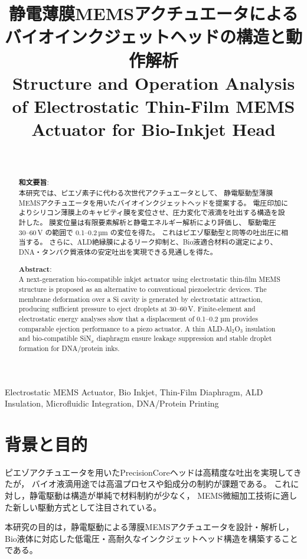 \documentclass[conference]{IEEEtran}
\title{静電薄膜MEMSアクチュエータによるバイオインクジェットヘッドの構造と動作解析\\
\large Structure and Operation Analysis of Electrostatic Thin-Film MEMS Actuator for Bio-Inkjet Head}
\author{%
  \IEEEauthorblockN{三溝 真一（Shinichi Samizo)}\\
  \IEEEauthorblockA{独立系半導体研究者（元セイコーエプソン）\\
  Email: \href{mailto:shin3t72@gmail.com}{shin3t72@gmail.com}\\
  GitHub: \url{https://github.com/Samizo-AITL}}%
}
\begin{document}
\maketitle

\begin{abstract}
\textbf{和文要旨}:\\
本研究では、ピエゾ素子に代わる次世代アクチュエータとして、
静電駆動型薄膜MEMSアクチュエータを用いたバイオインクジェットヘッドを提案する。
電圧印加によりシリコン薄膜上のキャビティ膜を変位させ、圧力変化で液滴を吐出する構造を設計した。
膜変位量は有限要素解析と静電エネルギー解析により評価し、
駆動電圧 30--60\,V の範囲で 0.1--0.2\,µm の変位を得た。
これはピエゾ駆動型と同等の吐出圧に相当する。
さらに、ALD絶縁膜によるリーク抑制と、Bio液適合材料の選定により、
DNA・タンパク質液体の安定吐出を実現できる見通しを得た。

\medskip
\noindent\textbf{Abstract}:\\
A next-generation bio-compatible inkjet actuator using electrostatic thin-film MEMS structure
is proposed as an alternative to conventional piezoelectric devices.
The membrane deformation over a Si cavity is generated by electrostatic attraction,
producing sufficient pressure to eject droplets at 30–60\,V.
Finite-element and electrostatic energy analyses show that a displacement of 0.1–0.2 µm
provides comparable ejection performance to a piezo actuator.
A thin ALD-Al$_2$O$_3$ insulation and bio-compatible SiN$_x$ diaphragm
ensure leakage suppression and stable droplet formation for DNA/protein inks.
\end{abstract}

\begin{IEEEkeywords}
Electrostatic MEMS Actuator, Bio Inkjet, Thin-Film Diaphragm, ALD Insulation, 
Microfluidic Integration, DNA/Protein Printing
\end{IEEEkeywords}

\section{背景と目的}
ピエゾアクチュエータを用いたPrecisionCoreヘッドは高精度な吐出を実現してきたが，
バイオ液滴用途では高温プロセスや鉛成分の制約が課題である。
これに対し，静電駆動は構造が単純で材料制約が少なく，
MEMS微細加工技術に適した新しい駆動方式として注目されている。

本研究の目的は，静電駆動による薄膜MEMSアクチュエータを設計・解析し，
Bio液体に対応した低電圧・高耐久なインクジェットヘッド構造を構築することである。
\end{document}
